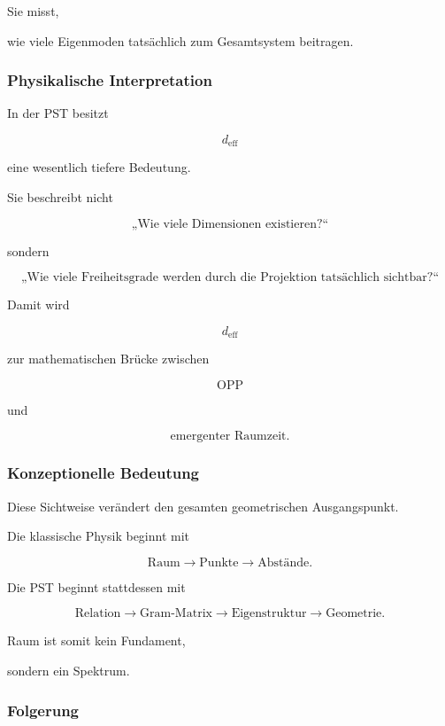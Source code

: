 Sie misst,

wie viele Eigenmoden tatsächlich zum Gesamtsystem beitragen.


\subsubsection*{Physikalische Interpretation}

In der PST besitzt

\[
d_{\mathrm{eff}}
\]

eine wesentlich tiefere Bedeutung.

Sie beschreibt nicht

\[
\text{„Wie viele Dimensionen existieren?“}
\]

sondern

\[
\boxed{
\text{„Wie viele Freiheitsgrade werden durch die Projektion tatsächlich sichtbar?“}
}
\]

Damit wird

\[
d_{\mathrm{eff}}
\]

zur mathematischen Brücke zwischen

\[
\text{OPP}
\]

und

\[
\text{emergenter Raumzeit}.
\]


\subsubsection*{Konzeptionelle Bedeutung}

Diese Sichtweise verändert den gesamten geometrischen Ausgangspunkt.

Die klassische Physik beginnt mit

\[
\text{Raum}
\rightarrow
\text{Punkte}
\rightarrow
\text{Abstände}.
\]

Die PST beginnt stattdessen mit

\[
\boxed{
\text{Relation}
\rightarrow
\text{Gram-Matrix}
\rightarrow
\text{Eigenstruktur}
\rightarrow
\text{Geometrie}.
}
\]

Raum ist somit kein Fundament,

sondern ein Spektrum.


\subsubsection*{Folgerung}

